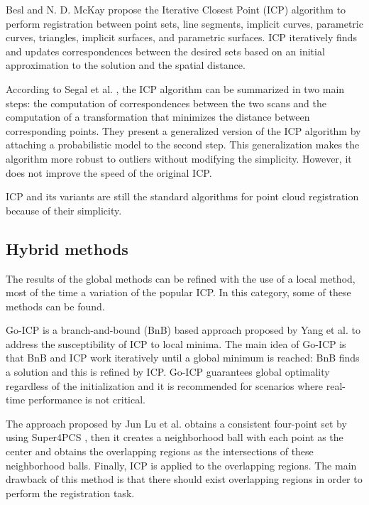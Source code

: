         Besl and N. D. McKay \cite{Besl_1992_amethod} propose the Iterative Closest Point (ICP) algorithm to perform registration 
        between point sets, line segments, implicit curves, parametric curves, triangles, implicit surfaces, and parametric surfaces.
        ICP iteratively finds and updates correspondences between the desired sets based on an initial approximation to the solution and 
        the spatial distance.

        According to Segal et al. \cite{Segal_2009_generalizedicp}, the ICP algorithm can be summarized in two main steps:
        the computation of correspondences between the two scans and 
        the computation of a transformation that minimizes the distance between corresponding points.
        They present a generalized version of the ICP algorithm by attaching a probabilistic model to the second step.
        This generalization makes the algorithm more robust to outliers without modifying the simplicity. 
        However, it does not improve the speed of the original ICP.

        ICP and its variants are still the standard algorithms for point cloud registration because of their simplicity. 

        \subsection{Hybrid methods}

        The results of the global methods can be refined with the use of a local method, most of the time a variation of the popular ICP.
        In this category, some of these methods can be found.

        Go-ICP is a branch-and-bound (BnB) based approach proposed by Yang et al. \cite{Yang_2016_goicp} to address the susceptibility of ICP to local minima. 
        The main idea of Go-ICP is that BnB and ICP work iteratively until a global minimum is reached: BnB finds a solution and this is refined by ICP.
        Go-ICP guarantees global optimality regardless of the initialization and it is recommended for scenarios where real-time performance is not critical.

        The approach proposed by Jun Lu et al. \cite{Lu_2019_4pcsicp} obtains a consistent four-point set by using Super4PCS \cite{Mellado_2014_super4pcs}, 
        then it creates a neighborhood ball with each point as the center and obtains the overlapping regions as the intersections
        of these neighborhood balls. Finally, ICP is applied to the overlapping regions. The main drawback of this method is that 
        there should exist overlapping regions in order to perform the registration task.

